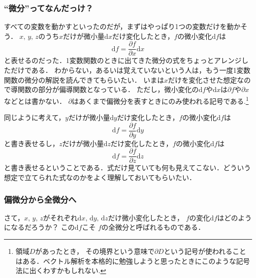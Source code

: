 \subsubsection{``微分''ってなんだっけ？}
すべての変数を動かすといったのだが，まずはやっぱり1つの変数だけを動かそう．
$x, \, y, \, z$のうち$x$だけが微小量$\mathrm{d}x$だけ変化したとき，$f$の微小変化$\mathrm{d}f$は
$$
\mathrm{d}f = \frac{\partial f}{\partial x} \mathrm{d}x
$$
と表せるのだった．1変数関数のときに出てきた微分の式をちょっとアレンジしただけである．
わからない，あるいは覚えていないという人は，もう一度1変数関数の微分の解説を読んできてもらいたい．
いまは$x$だけを変化させた想定なので導関数の部分が偏導関数となっている．
ただし，微小変化の$\mathrm{d}f$や$\mathrm{d}x$は$\partial f$や$\partial x$などとは書かない．
$\partial$はあくまで偏微分を表すときにのみ使われる記号である.\footnote{領域$D$があったとき，
その境界という意味で$\partial D$という記号が使われることはある．ベクトル解析を本格的に勉強しようと思ったときにこのような記号法に出くわすかもしれない.}

同じように考えて，$y$だけが微小量$\mathrm{d}y$だけ変化したとき，$f$の微小変化$\mathrm{d}f$は
$$
\mathrm{d}f = \frac{\partial f}{\partial y} \mathrm{d}y
$$
と書き表せるし，$z$だけが微小量$\mathrm{d}z$だけ変化したとき，$f$の微小変化$\mathrm{d}f$は
$$
\mathrm{d}f = \frac{\partial f}{\partial z} \mathrm{d}z
$$
と書き表せるということである．式だけ見ていても何も見えてこない．どういう想定で立てられた式なのかをよく理解しておいてもらいたい．

\subsubsection{偏微分から全微分へ}
さて，$x, \, y, \, z$がそれぞれ$\mathrm{d}x, \, \mathrm{d}y, \, \mathrm{d}z$だけ微小変化したとき，
$f$の変化$\mathrm{d}f$はどのようになるだろうか？ この$\mathrm{d}f$こそ
$f$の全微分と呼ばれるものである．

